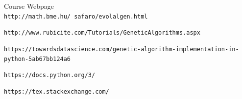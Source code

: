 \documentclass[12pt,english]{article}
\begin{document}
\begin{thebibliography}{9}

Course Webpage
\\\texttt{http://math.bme.hu/~safaro/evolalgen.html}

\texttt{http://www.rubicite.com/Tutorials/GeneticAlgorithms.aspx}

\texttt{https://towardsdatascience.com/genetic-algorithm-implementation-in-python-5ab67bb124a6}

\texttt{https://docs.python.org/3/}


\texttt{https://tex.stackexchange.com/}

\end{thebibliography}
\end{document}

